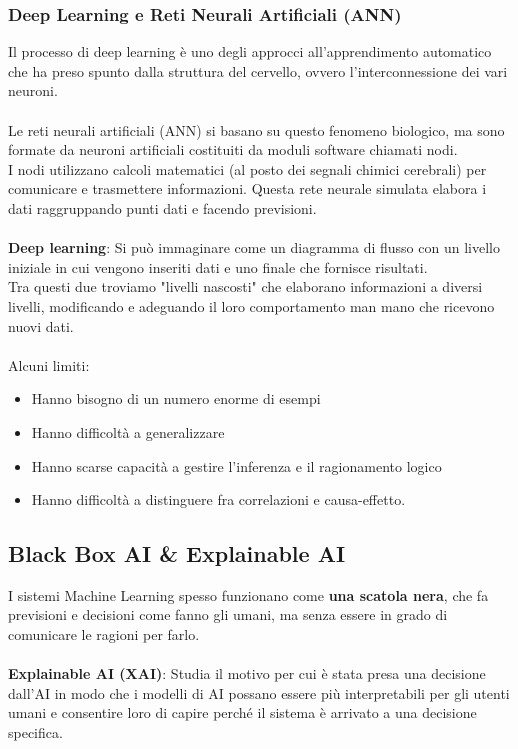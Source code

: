 \documentclass[../main.tex]{subfiles}
\begin{document}
	\subsubsection{Deep Learning e Reti Neurali Artificiali (ANN)}
	Il processo di deep learning è uno degli approcci all'apprendimento automatico che ha preso spunto dalla struttura del cervello, ovvero l'interconnessione dei vari neuroni.\\ \\
	Le reti neurali artificiali (ANN) si basano su questo fenomeno biologico, ma sono formate da neuroni artificiali costituiti da moduli software chiamati nodi. \\
	I nodi utilizzano calcoli matematici (al posto dei segnali chimici cerebrali) per comunicare e trasmettere informazioni. Questa rete neurale simulata elabora i dati raggruppando punti dati e facendo previsioni. \\ \\
	\textbf{Deep learning}: Si può immaginare come un diagramma di flusso con un livello iniziale in cui vengono inseriti dati e uno finale che fornisce risultati. \\
	Tra questi due troviamo "livelli nascosti" che elaborano informazioni a diversi livelli, modificando e adeguando il loro comportamento man mano che ricevono nuovi dati.\\ \\
	Alcuni limiti:
	\begin{itemize}
		\item Hanno bisogno di un numero enorme di esempi 
		\item Hanno difficoltà a generalizzare
		\item Hanno scarse capacità a gestire l’inferenza e il ragionamento logico
		\item Hanno difficoltà a distinguere fra correlazioni e causa-effetto.
	\end{itemize}
	\subsection{Black Box AI \& Explainable AI}
	I sistemi Machine Learning spesso funzionano come \textbf{una scatola nera}, che fa previsioni e decisioni come fanno gli umani, ma senza essere in grado di comunicare le ragioni per farlo.\\ \\
	\textbf{Explainable AI (XAI)}: Studia il motivo per cui è stata presa una decisione dall’AI in modo che i modelli di AI possano essere più interpretabili per gli utenti umani e consentire loro di capire perché il sistema è arrivato a una decisione specifica.
\end{document}
